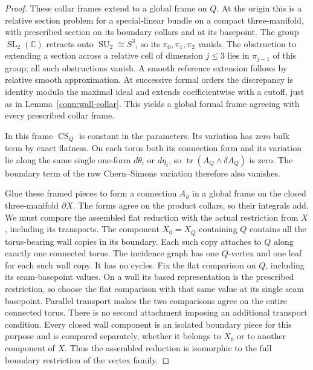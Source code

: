 \begin{proof}
These collar frames extend to a global frame on
\(Q\).  At the origin this is a relative section
problem for a special-linear bundle on a compact
three-manifold, with prescribed section on its
boundary collars and at its basepoint.
The group \(\operatorname{SL}_2(\mathbb C)\) retracts
onto \(\operatorname{SU}_2\cong S^3\), so its
\(\pi_0,\pi_1,\pi_2\) vanish.  The obstruction to
extending a section across a relative cell of
dimension \(j\leq3\) lies in \(\pi_{j-1}\) of
this group; all such obstructions vanish.
A smooth reference extension follows by relative
smooth approximation.  At successive formal orders
the discrepancy is identity modulo the maximal
ideal and extends coefficientwise with a cutoff,
just as in Lemma~\ref{conn:wall-collar}.
This yields a global formal frame agreeing with
every prescribed collar frame.

In this frame \(\operatorname{CS}_Q\) is constant in
the parameters.  Its variation has zero bulk term
by exact flatness.  On each torus both its connection
form and its variation lie along the same single
one-form \(d\theta_i\) or \(d\eta_i\), so
\(\operatorname{tr}(A_Q\wedge\delta A_Q)\) is zero.
The boundary term of the raw Chern--Simons variation
therefore also vanishes.

Glue these framed pieces to form a connection
\(A_{\partial}\) in a global frame on the closed
three-manifold \(\partial X\).  The forms agree on
the product collars, so their integrals add.
We must compare the assembled flat reduction with
the actual restriction from \(X\), including its
transports.  The component \(X_0=X_Q\) containing \(Q\)
contains all the torus-bearing wall copies in its
boundary.  Each such copy attaches to \(Q\) along
exactly one connected torus.  The incidence graph
has one \(Q\)-vertex and one leaf for each such
wall copy.  It has no cycles.
Fix the flat comparison on \(Q\), including its
seam-basepoint values.  On a wall its based
representation is the prescribed restriction,
so choose the flat comparison with that same
value at its single seam basepoint.
Parallel transport makes the two comparisons
agree on the entire connected torus.
There is no second attachment imposing an
additional transport condition.  Every closed
wall component is an isolated boundary piece
for this purpose and is compared separately,
whether it belongs to \(X_0\) or to another
component of \(X\).  Thus the assembled reduction
is isomorphic to the full boundary restriction
of the vertex family.


\end{proof}

